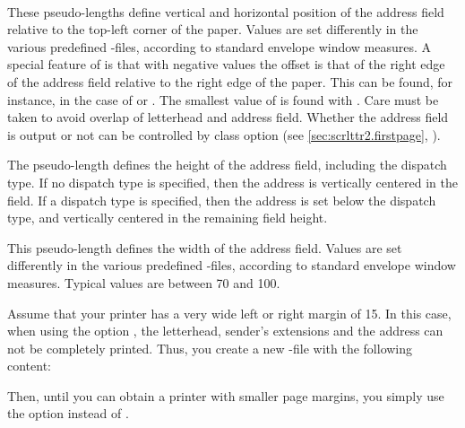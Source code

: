 \begin{Declaration}
  \\
\end{Declaration}
%
%
These pseudo-lengths define vertical and horizontal position of the address
field relative to the top-left corner of the paper. Values are set differently
in the various predefined
-files,
according to standard envelope window measures. A special feature of
 is that with negative values the offset is that of the
right edge of the address field relative to the right edge of the paper. This
can be found, for instance, in the case of  or . The
smallest value of  is found with . Care
must be taken to avoid overlap of letterhead and address field. Whether the
address field is output or not can be controlled by class option
 (see \autoref{sec:scrlttr2.firstpage},
).%
%
%
%


\begin{Declaration}
\end{Declaration}
%
The pseudo-length  defines the height of the
address field, including the dispatch type. If no dispatch type is
specified, then the address is vertically centered in the field. If a
dispatch type is specified, then the address is set below the dispatch
type, and vertically centered in the remaining field height.
%
%
 

\begin{Declaration}
\end{Declaration}
%
This pseudo-length defines the width of the address field. Values are set
differently in the various predefined
-files,
according to standard envelope window measures. Typical values are between
70 and 100.
\begin{Example}
  Assume that your printer has a very wide left or right margin of
  15. In this case, when using the option , the
  letterhead, sender's extensions and the address can not be completely
  printed. Thus, you create a new -file with the following content:
  Then, until you can obtain a printer with smaller page margins, you
  simply use the option  instead of .
\end{Example}
%
%


